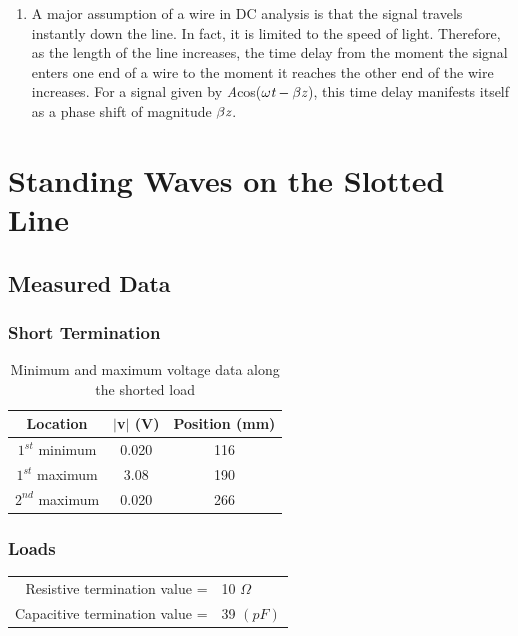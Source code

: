 \documentclass{article}
\begin{document}
\begin{enumerate}
\begin{enumerate}
	\end{enumerate}
	\item A major assumption of a wire in DC analysis is that the signal travels instantly down the line. In fact, it is limited to the speed of light. Therefore, as the length of the line increases, the time delay from the moment the signal enters one end of a wire to the moment it reaches the other end of the wire increases. For a signal given by \emph{A}cos($\omega\emph{t}-\beta\emph{z}$), this time delay manifests itself as a phase shift of magnitude $\beta\emph{z}$.
\end{enumerate}

\section{Standing Waves on the Slotted Line}
\subsection{Measured Data}
\subsubsection{Short Termination}
\begin{table}[h]
\centering
	\begin{tabular}{|c|c|c|}
	\hline
	\textbf{Location} & $\mid$v$\mid$ (V) & \textbf{Position (mm)} \\ \hline
	$1^{st}$ minimum       & 0.020   & 116                    \\ \hline
	$1^{st}$ maximum       & 3.08    & 190                    \\ \hline
	$2^{nd}$ maximum       & 0.020   & 266                    \\ \hline
	\end{tabular}
	\caption{Minimum and maximum voltage data along the shorted load}
	\label{my-label}
\end{table}

\subsubsection{Loads}

\begin{table}[h]
	\begin{tabular}{rl}
	Resistive termination value =  & 10 $\Omega$ \\
	Capacitive termination value = & 39 $(pF)$      
	\end{tabular}
\end{table}
\end{document}
